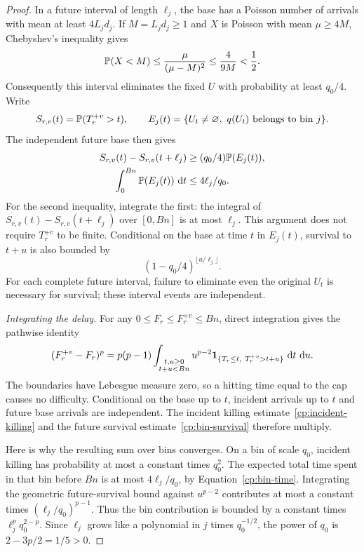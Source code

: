 \begin{proof}
In a future interval of length $\ell_j$, the base has a Poisson number of
arrivals with mean at least $4L_jd_j$. If $M=L_jd_j\ge1$ and $X$ is
Poisson with mean $\mu\ge4M$, Chebyshev's inequality gives
\[
 \mathbb P(X<M)\le\frac{\mu}{(\mu-M)^2}
 \le\frac4{9M}<\frac12.
\]
Consequently this interval eliminates the fixed $U$ with probability at
least $q_0/4$. Write
\[
 S_{r,v}(t)=\mathbb P(T_r^{+v}>t),\qquad
 E_j(t)=\{U_t\ne\varnothing,\ q(U_t)\text{ belongs to bin }j\}.
\]
The independent future base then gives
\begin{equation}\label{cp:bin-time}
 \begin{split}
 S_{r,v}(t)-S_{r,v}(t+\ell_j)&\ge(q_0/4)\mathbb P(E_j(t)),\\
 \int_0^{Bn}\mathbb P(E_j(t))\,\,\mathrm d t&\le4\ell_j/q_0.
 \end{split}
\end{equation}
For the second inequality, integrate the first: the integral of
$S_{r,v}(t)-S_{r,v}(t+\ell_j)$ over $[0,Bn]$ is at most $\ell_j$.
This argument does not require $T_r^{+v}$ to be finite. Conditional on the
base at time $t$ in $E_j(t)$, survival to $t+u$ is also bounded by
\begin{equation}\label{cp:bin-survival}
 (1-q_0/4)^{\lfloor u/\ell_j\rfloor}.
\end{equation}
For each complete future interval, failure to eliminate even the original
$U_t$ is necessary for survival; these interval events are independent.

\emph{Integrating the delay.}
For any $0\le F_r\le F_r^{+v}\le Bn$, direct integration gives the
pathwise identity
\begin{equation}\label{cp:delay-integral}
 (F_r^{+v}-F_r)^p
 =p(p-1)\int_{\substack{t,u\ge0\\t+u<Bn}}
 u^{p-2}\mathbf 1_{\{T_r\le t,\ T_r^{+v}>t+u\}}\,\,\mathrm d t\,\,\mathrm d u.
\end{equation}
The boundaries have Lebesgue measure zero, so a hitting time equal to the
cap causes no difficulty. Conditional on the base up to $t$, incident
arrivals up to $t$ and future base arrivals are independent. The incident
killing estimate~\eqref{cp:incident-killing} and the future survival
estimate~\eqref{cp:bin-survival} therefore multiply.

Here is why the resulting sum over bins converges. On a bin of scale
$q_0$, incident killing has probability at most a constant times $q_0^2$.
The expected total time spent in that bin before $Bn$ is at most
$4\ell_j/q_0$, by
Equation~\eqref{cp:bin-time}. Integrating the geometric future-survival
bound against $u^{p-2}$ contributes at most a constant times
$(\ell_j/q_0)^{p-1}$. Thus the bin contribution is bounded by a constant times
$\ell_j^p q_0^{2-p}$. Since $\ell_j$ grows like a polynomial in $j$ times
$q_0^{-1/2}$, the power of $q_0$ is $2-3p/2=1/5>0$.


\end{proof}
